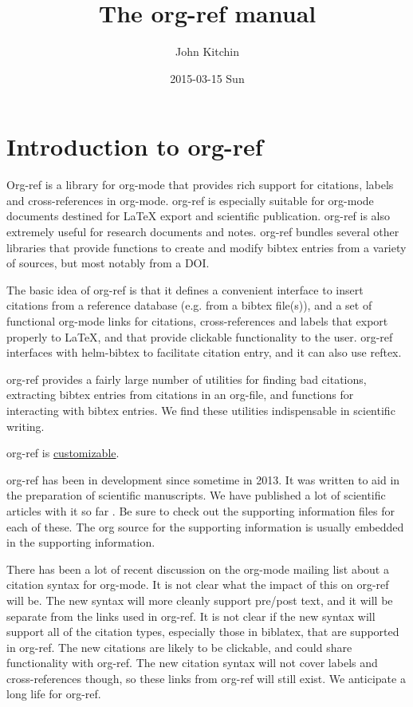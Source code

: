 \documentclass[11pt]{article}
\author{John Kitchin}
\date{2015-03-15 Sun}
\title{The org-ref manual}
\begin{document}
\maketitle
\maketitle
\tableofcontents


\section{Introduction to org-ref}
\label{sec:orgheadline13}
Org-ref is a library for org-mode \cite{Dominik201408} that provides rich support for citations, labels and cross-references in org-mode. org-ref is especially suitable for org-mode documents destined for \LaTeX{} export and scientific publication. org-ref is also extremely useful for research documents and notes. org-ref bundles several other libraries that provide functions to create and modify bibtex entries from a variety of sources, but most notably from a DOI.

The basic idea of org-ref is that it defines a convenient interface to insert citations from a reference database (e.g. from a bibtex file(s)), and a  set of functional org-mode links for citations, cross-references and labels that export properly to \LaTeX{}, and that provide clickable functionality to the user. org-ref interfaces with helm-bibtex to facilitate citation entry, and it can also use reftex.

org-ref provides a fairly large number of utilities for finding bad citations, extracting bibtex entries from citations in an org-file, and functions for interacting with bibtex entries. We find these utilities indispensable in scientific writing.

org-ref is \hyperref[sec:orgheadline1]{customizable}.

org-ref has been in development since sometime in 2013. It was written to aid in the preparation of scientific manuscripts.  We have published a lot of scientific articles with it so far  \cite{hallenbeck-2013-effec,mehta-2014-ident-poten,xu-2014-relat-elect,xu-2014-probin-cover,miller-2014-simul-temper,curnan-2014-effec-concen,boes-2015-estim-bulk,xu-2015-linear-respon,xu-2015-relat-between}. Be sure to check out the supporting information files for each of these. The org source for the supporting information is usually embedded in the supporting information.

There has been a lot of recent discussion on the org-mode mailing list about a citation syntax for org-mode. It is not clear what the impact of this on org-ref will be. The new syntax will more cleanly support pre/post text, and it will be separate from the links used in org-ref. It is not clear if the new syntax will support all of the citation types, especially those in biblatex, that are supported in org-ref. The new citations are likely to be clickable, and could share functionality with org-ref. The new citation syntax will not cover labels and cross-references though, so these links from org-ref will still exist. We anticipate a long life for org-ref.
\end{document}
